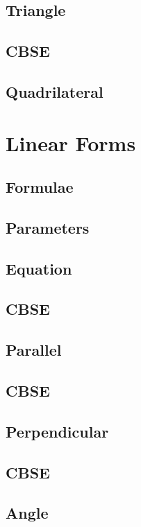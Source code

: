 \documentclass[journal]{IEEEtran}
\begin{document}
\subsection{Triangle}

\subsection{CBSE}

\subsection{Quadrilateral}

\newpage
\section{Linear Forms}
\subsection{Formulae}

\subsection{Parameters}

\subsection{Equation }

\subsection{CBSE}

\subsection{Parallel}

\subsection{CBSE}

\subsection{Perpendicular}

\subsection{CBSE}

\subsection{Angle}

\end{document}
